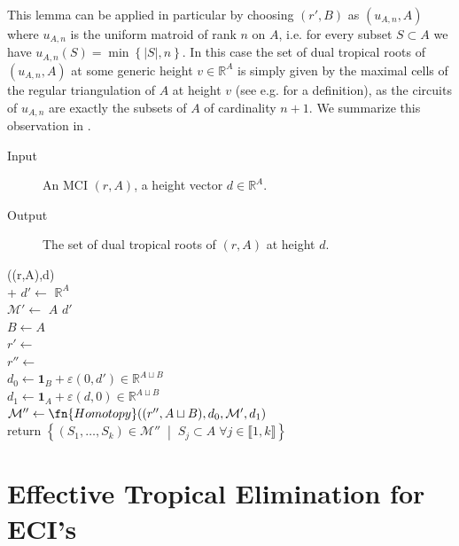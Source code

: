 \documentclass[a4paper]{article}
\theoremstyle{remark}
\newcommand{\set}[1]{\left\{#1\right\}}
\newcommand{\setdes}[2]{\left\{#1\;\middle|\;#2\right\}}
\def\RR{\mathbb{R}}
\newcommand{\irng}[1]{\llbracket #1 \rrbracket}
\begin{document}
This lemma can be applied in particular by choosing $(r',B)$ as
$(u_{A,n},A)$ where $u_{A,n}$ is the uniform matroid of rank $n$ on
$A$, i.e. for every subset $S\subset A$ we have
$u_{A,n}(S) = \min\set{|S|,n}$. In this case the set of dual tropical
roots of $(u_{A,n},A)$ at some generic height $v\in \RR^A$ is simply
given by the maximal cells of the regular triangulation of $A$ at
height $v$ (see e.g. \cite{gelfand1994} for a definition), as the
circuits of $u_{A,n}$ are exactly the subsets of $A$ of cardinality
$n + 1$. We summarize this observation in .

\begin{algorithm}
  \caption{Computing Mixed Subdivisions of MCI's}
  \label{alg:msd}
  \raggedright

  \begin{description}
  \item[Input] An MCI $(r,A)$, a height vector $d\in \RR^A$.
  \item[Output] The set of dual tropical roots of $(r,A)$ at height $d$.
  \end{description}

  \begin{pseudo}
     ((r,A),d)\\+
    $d' \gets $  $\RR^A$\\
    $\mathcal{M}' \gets $  $A$  $d'$\\
    $B \gets A$\\
    $r' \gets$ \\
    $r''\gets$ \\
    $d_0 \gets \mathbf{1}_B + \varepsilon (0, d') \in \RR^{A\sqcup B}$\\
    $d_1 \gets \mathbf{1}_A + \varepsilon (d, 0) \in \RR^{A\sqcup B}$\\
    $\mathcal{M}'' \gets \fn{Homotopy}((r'',A\sqcup B), d_0, \mathcal{M}', d_1)$\\
    return $\setdes{(S_1,\dots,S_k)\in \mathcal{M}''}{S_j\subset A\; \forall j\in \irng{1,k}}$
  \end{pseudo}
\end{algorithm}

\section{Effective Tropical Elimination for ECI's}
\label{sec:dte}
\end{document}
